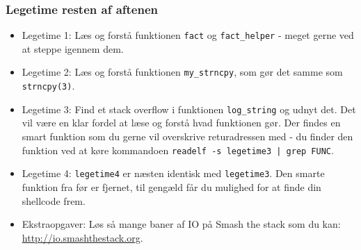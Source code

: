 \documentclass[slidestop,compress,mathserif, xcolor=table]{beamer}
\begin{document}
\begin{frame}[c]
    \frametitle{Legetime resten af aftenen}

    \pause
    {\footnotesize
      \begin{itemize}
      \item Legetime 1: Læs og forstå funktionen \texttt{fact} og
        \texttt{fact\_helper} - meget gerne ved at steppe igennem dem.

      \item Legetime 2: Læs og forstå funktionen \texttt{my\_strncpy}, som gør
        det samme som \texttt{strncpy(3)}.

      \item Legetime 3: Find et stack overflow i funktionen \texttt{log\_string}
        og udnyt det. Det vil være en klar fordel at læse og forstå hvad
        funktionen gør. Der findes en smart funktion som du gerne vil overskrive
        returadressen med - du finder den funktion ved at køre kommandoen
        \texttt{readelf -s legetime3 | grep FUNC}.

      \item Legetime 4: \texttt{legetime4} er næsten identisk med
        \texttt{legetime3}. Den smarte funktion fra før er fjernet, til gengæld
        får du mulighed for at finde din shellcode frem.

      \item Ekstraopgaver: Løs så mange baner af IO på Smash the stack som
        du kan: \url{http://io.smashthestack.org}.


      \end{itemize}
    }
\end{frame}
\end{document}
